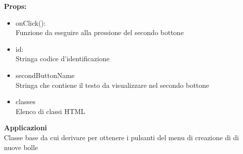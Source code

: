\textbf{Props:} 
\begin{itemize}
\item onClick(): 
\\
Funzione da eseguire alla pressione del secondo bottone 
\item id: 
\\
Stringa codice d'identificazione
\item secondButtonName
\\
Stringa che contiene il testo da visualizzare nel secondo bottone
\item classes
\\
Elenco di classi HTML
\end{itemize} 


\textbf{Applicazioni}\\
Classe base da cui derivare per ottenere i pulsanti del menu di creazione di di nuove bolle 


\clearpage

